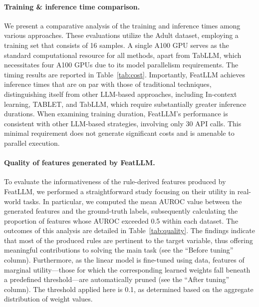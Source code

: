 \vspace*{-0.12in}
\paragraph{Training \& inference time comparison.} We present a comparative analysis of the training and inference times among various approaches. These evaluations utilize the Adult dataset, employing a training set that consists of 16 samples. A single A100 GPU serves as the standard computational resource for all methods, apart from TabLLM, which necessitates four A100 GPUs due to its model parallelism requirements. The timing results are reported in Table~\ref{tab:cost}. Importantly, \textsf{FeatLLM} achieves inference times that are on par with those of traditional techniques, distinguishing itself from other LLM-based approaches, including In-context learning, TABLET, and TabLLM, which require substantially greater inference durations. When examining training duration, \textsf{FeatLLM}'s performance is consistent with other LLM-based strategies, involving only 30 API calls. This minimal requirement does not generate significant costs and is amenable to parallel execution.

\vspace*{-0.12in}
\paragraph{Quality of features generated by \textsf{FeatLLM}.}
To evaluate the informativeness of the rule-derived features produced by \textsf{FeatLLM}, we performed a straightforward study focusing on their utility in real-world tasks. In particular, we computed the mean AUROC value between the generated features and the ground-truth labels, subsequently calculating the proportion of features whose AUROC exceeded 0.5 within each dataset. The outcomes of this analysis are detailed in Table~\ref{tab:quality}. The findings indicate that most of the produced rules are pertinent to the target variable, thus offering meaningful contributions to solving the main task (see the ``Before tuning'' column). Furthermore, as the linear model is fine-tuned using data, features of marginal utility—those for which the corresponding learned weights fall beneath a predefined threshold—are automatically pruned (see the ``After tuning'' column). The threshold applied here is 0.1, as determined based on the aggregate distribution of weight values.

\vspace*{-0.12in}
